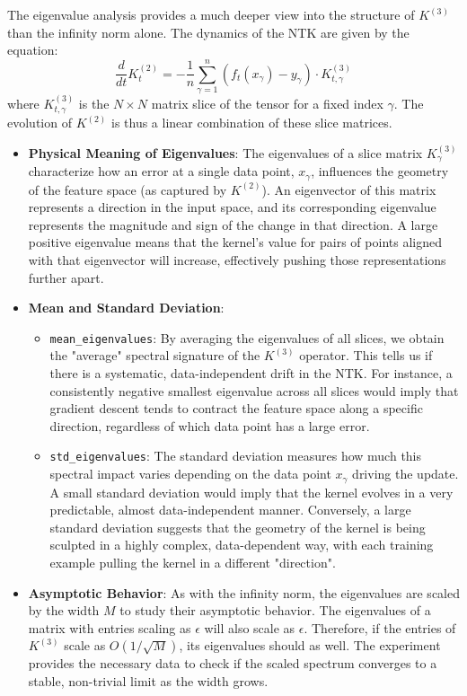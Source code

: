 \documentclass[a4paper]{article}
\begin{document}
The eigenvalue analysis provides a much deeper view into the structure of $K^{(3)}$ than the infinity norm alone. The dynamics of the NTK are given by the equation:
\[ \frac{d}{dt} K^{(2)}_t = -\frac{1}{n} \sum_{\gamma=1}^n (f_t(x_\gamma) - y_\gamma) \cdot K^{(3)}_{t, \gamma} \]
where $K^{(3)}_{t, \gamma}$ is the $N \times N$ matrix slice of the tensor for a fixed index $\gamma$. The evolution of $K^{(2)}$ is thus a linear combination of these slice matrices.

\begin{itemize}
    \item \textbf{Physical Meaning of Eigenvalues}: The eigenvalues of a slice matrix $K^{(3)}_\gamma$ characterize how an error at a single data point, $x_\gamma$, influences the geometry of the feature space (as captured by $K^{(2)}$). An eigenvector of this matrix represents a direction in the input space, and its corresponding eigenvalue represents the magnitude and sign of the change in that direction. A large positive eigenvalue means that the kernel's value for pairs of points aligned with that eigenvector will increase, effectively pushing those representations further apart.

    \item \textbf{Mean and Standard Deviation}:
    \begin{itemize}
        \item \texttt{mean\_eigenvalues}: By averaging the eigenvalues of all slices, we obtain the "average" spectral signature of the $K^{(3)}$ operator. This tells us if there is a systematic, data-independent drift in the NTK. For instance, a consistently negative smallest eigenvalue across all slices would imply that gradient descent tends to contract the feature space along a specific direction, regardless of which data point has a large error.
        \item \texttt{std\_eigenvalues}: The standard deviation measures how much this spectral impact varies depending on the data point $x_\gamma$ driving the update. A small standard deviation would imply that the kernel evolves in a very predictable, almost data-independent manner. Conversely, a large standard deviation suggests that the geometry of the kernel is being sculpted in a highly complex, data-dependent way, with each training example pulling the kernel in a different "direction".
    \end{itemize}

    \item \textbf{Asymptotic Behavior}: As with the infinity norm, the eigenvalues are scaled by the width $M$ to study their asymptotic behavior. The eigenvalues of a matrix with entries scaling as $\epsilon$ will also scale as $\epsilon$. Therefore, if the entries of $K^{(3)}$ scale as $O(1/\sqrt{M})$, its eigenvalues should as well. The experiment provides the necessary data to check if the scaled spectrum converges to a stable, non-trivial limit as the width grows.
\end{itemize}
\end{document}
